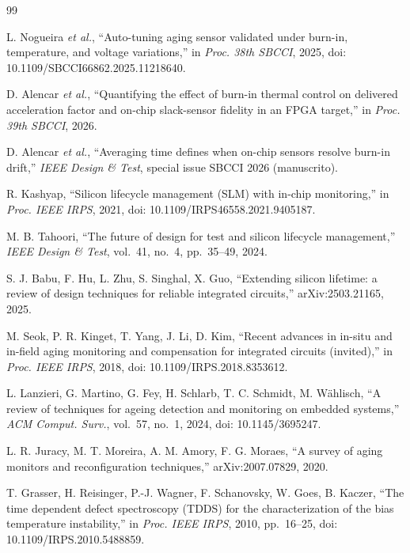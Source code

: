 \documentclass[11pt,a4paper]{article}
\begin{document}
\begin{thebibliography}{99}\small

 L. Nogueira \emph{et al.}, ``Auto-tuning aging sensor validated under burn-in, temperature,
and voltage variations,'' in \emph{Proc. 38th SBCCI}, 2025, doi: 10.1109/SBCCI66862.2025.11218640.

 D. Alencar \emph{et al.}, ``Quantifying the effect of burn-in thermal control on delivered
acceleration factor and on-chip slack-sensor fidelity in an FPGA target,'' in \emph{Proc. 39th SBCCI}, 2026.

 D. Alencar \emph{et al.}, ``Averaging time defines when on-chip sensors resolve burn-in drift,''
\emph{IEEE Design \& Test}, special issue SBCCI 2026 (manuscrito).

 R. Kashyap, ``Silicon lifecycle management (SLM) with in-chip monitoring,'' in \emph{Proc. IEEE
IRPS}, 2021, doi: 10.1109/IRPS46558.2021.9405187.

 M. B. Tahoori, ``The future of design for test and silicon lifecycle management,'' \emph{IEEE
Design \& Test}, vol.~41, no.~4, pp.~35--49, 2024.

 S. J. Babu, F. Hu, L. Zhu, S. Singhal, X. Guo, ``Extending silicon lifetime: a review of design
techniques for reliable integrated circuits,'' arXiv:2503.21165, 2025.

 M. Seok, P. R. Kinget, T. Yang, J. Li, D. Kim, ``Recent advances in in-situ and in-field aging
monitoring and compensation for integrated circuits (invited),'' in \emph{Proc. IEEE IRPS}, 2018, doi:
10.1109/IRPS.2018.8353612.

 L. Lanzieri, G. Martino, G. Fey, H. Schlarb, T. C. Schmidt, M. Wählisch, ``A review of
techniques for ageing detection and monitoring on embedded systems,'' \emph{ACM Comput. Surv.}, vol.~57, no.~1, 2024, doi:
10.1145/3695247.

 L. R. Juracy, M. T. Moreira, A. M. Amory, F. G. Moraes, ``A survey of aging monitors and
reconfiguration techniques,'' arXiv:2007.07829, 2020.

 T. Grasser, H. Reisinger, P.-J. Wagner, F. Schanovsky, W. Goes, B. Kaczer, ``The time dependent
defect spectroscopy (TDDS) for the characterization of the bias temperature instability,'' in \emph{Proc. IEEE IRPS},
2010, pp.~16--25, doi: 10.1109/IRPS.2010.5488859.


\end{thebibliography}
\end{document}
